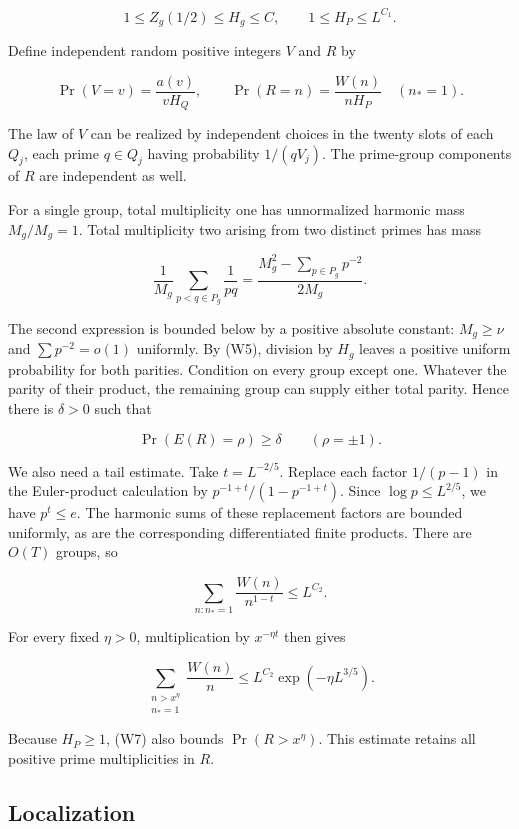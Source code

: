 \[
1\le Z_g(1/2)\le H_g\le C,
\qquad 1\le H_P\le L^{C_1}. \tag{W5}
\]

Define independent random positive integers \(V\) and \(R\) by

\[
\Pr(V=v)=\frac{a(v)}{vH_Q},\qquad
\Pr(R=n)=\frac{W(n)}{nH_P}\quad(n_*=1).
\]

The law of \(V\) can be realized by independent choices in the twenty
slots of each \(Q_j\), each prime \(q\in Q_j\) having probability
\(1/(qV_j)\). The prime-group components of \(R\) are independent as
well.

For a single group, total multiplicity one has unnormalized harmonic
mass \(M_g/M_g=1\). Total multiplicity two arising from two distinct
primes has mass

\[
\frac1{M_g}\sum_{p<q\in P_g}\frac1{pq}
 =\frac{M_g^2-\sum_{p\in P_g}p^{-2}}{2M_g}.
\]

The second expression is bounded below by a positive absolute constant:
\(M_g\ge\nu\) and \(\sum p^{-2}=o(1)\) uniformly. By (W5), division by
\(H_g\) leaves a positive uniform probability for both parities.
Condition on every group except one. Whatever the parity of their
product, the remaining group can supply either total parity. Hence there
is \(\delta>0\) such that

\[
\Pr(E(R)=\rho)\ge\delta\qquad(\rho=\pm1). \tag{W6}
\]

We also need a tail estimate. Take \(t=L^{-2/5}\). Replace each factor
\(1/(p-1)\) in the Euler-product calculation by
\(p^{-1+t}/(1-p^{-1+t})\). Since \(\log p\le L^{2/5}\), we have
\(p^t\le e\). The harmonic sums of these replacement factors are bounded
uniformly, as are the corresponding differentiated finite products.
There are \(O(T)\) groups, so

\[
\sum_{n:n_*=1}\frac{W(n)}{n^{1-t}}\le L^{C_2}.
\]

For every fixed \(\eta>0\), multiplication by \(x^{-\eta t}\) then gives

\[
\sum_{\substack{n>x^\eta\\n_*=1}}\frac{W(n)}n
 \le L^{C_2}\exp(-\eta L^{3/5}). \tag{W7}
\]

Because \(H_P\ge1\), (W7) also bounds \(\Pr(R>x^\eta)\). This estimate
retains all positive prime multiplicities in \(R\).


\hypertarget{weights-localization}{%
\subsection{Localization}\label{weights-localization}}


